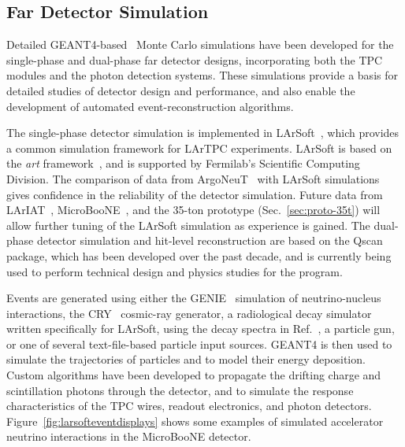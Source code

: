 %

\subsection{Far Detector Simulation}
\label{sec:detectors-sc-physics-software-simulation-fd}

Detailed GEANT4-based~\cite{GEANT4:NIM,GEANT4} Monte Carlo simulations have been 
developed for the single-phase and dual-phase far detector designs,
incorporating both the TPC modules
and the photon detection systems. These simulations provide
a basis for detailed studies of detector design and performance, 
and also enable the development of automated event-reconstruction algorithms.

The single-phase detector simulation is implemented in LArSoft~\cite{Church:2013hea},
which provides a common simulation framework for LArTPC experiments.
LArSoft is based on the {\it art} framework~\cite{Green:2012gv}, and is supported by Fermilab's
Scientific Computing Division.
The comparison of data from ArgoNeuT~\cite{Anderson:2012vc,Anderson:2012mra} with LArSoft
simulations gives confidence in the reliability of the detector simulation.
Future data from LArIAT~\cite{Adamson:2013/02/28tla,Cavanna:2014iqa},
MicroBooNE~\cite{Chen:2007ae,Jones:2011ci,microboonecdr}, and the 35-ton prototype (Sec.~\ref{sec:proto-35t}) will allow
further tuning of the LArSoft simulation as experience is gained.
The dual-phase detector simulation and hit-level reconstruction are based on the Qscan~\cite{lussi:thesis} package,
which has been developed over the past decade, and is currently
being used to perform technical design and physics studies for
the \cerndualproto{} program.  

Events are generated using either the GENIE~\cite{GENIE} simulation of 
neutrino-nucleus interactions, the CRY~\cite{Cosmic-CRY,Cosmic-CRY-protons,CRY-url} cosmic-ray generator, 
a radiological decay simulator written specifically for LArSoft, using the decay spectra
in Ref.~\cite{docdb-8797}, a particle gun, or one of several
text-file-based particle input sources. GEANT4 is then used to simulate the trajectories
of particles and to model their energy deposition.  
Custom algorithms have been developed to propagate the drifting charge
and scintillation photons through the detector, and to simulate the
response characteristics of the TPC wires, readout electronics, and photon detectors.
Figure~\ref{fig:larsofteventdisplays} shows some examples of simulated 
accelerator neutrino interactions in the MicroBooNE detector.

